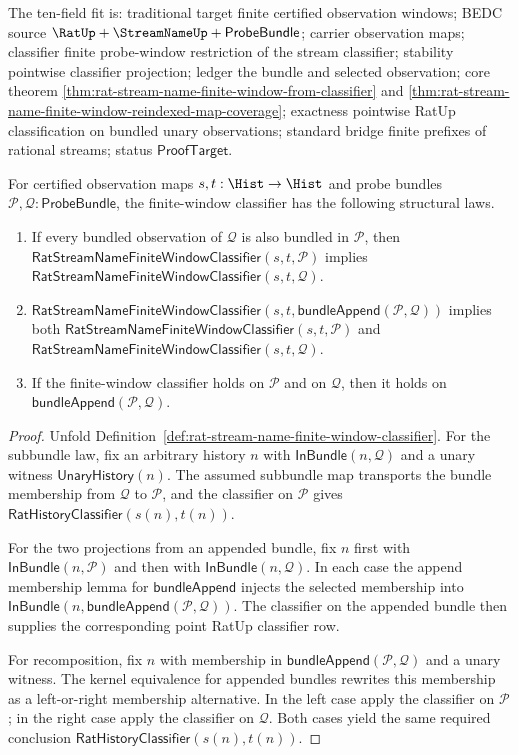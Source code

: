 The ten-field fit is: traditional target finite certified observation windows;
BEDC source $\RatUp+\StreamNameUp+\mathsf{ProbeBundle}$; carrier observation
maps; classifier finite probe-window restriction of the stream classifier;
stability pointwise classifier projection; ledger the bundle and selected
observation; core theorem
\autoref{thm:rat-stream-name-finite-window-from-classifier} and
\autoref{thm:rat-stream-name-finite-window-reindexed-map-coverage}; exactness
pointwise RatUp classification on bundled unary observations; standard bridge
finite prefixes of rational streams; status $\mathsf{ProofTarget}$.

\begin{theorem}
\label{thm:rat-stream-name-finite-window-structural-laws}
For certified observation maps $s,t:\Hist\to\Hist$ and probe bundles
$\mathcal{P},\mathcal{Q}:\mathsf{ProbeBundle}$, the finite-window classifier
has the following structural laws.
\begin{enumerate}
\item If every bundled observation of $\mathcal{Q}$ is also bundled in
$\mathcal{P}$, then
$\mathsf{RatStreamNameFiniteWindowClassifier}(s,t,\mathcal{P})$ implies
$\mathsf{RatStreamNameFiniteWindowClassifier}(s,t,\mathcal{Q})$.
\item
$\mathsf{RatStreamNameFiniteWindowClassifier}
(s,t,\mathsf{bundleAppend}(\mathcal{P},\mathcal{Q}))$ implies both
$\mathsf{RatStreamNameFiniteWindowClassifier}(s,t,\mathcal{P})$ and
$\mathsf{RatStreamNameFiniteWindowClassifier}(s,t,\mathcal{Q})$.
\item If the finite-window classifier holds on $\mathcal{P}$ and on
$\mathcal{Q}$, then it holds on
$\mathsf{bundleAppend}(\mathcal{P},\mathcal{Q})$.
\end{enumerate}
\end{theorem}
\begin{proof}
Unfold Definition~\ref{def:rat-stream-name-finite-window-classifier}. For the
subbundle law, fix an arbitrary history $n$ with
$\mathsf{InBundle}(n,\mathcal{Q})$ and a unary witness
$\mathsf{UnaryHistory}(n)$. The assumed subbundle map transports the bundle
membership from $\mathcal{Q}$ to $\mathcal{P}$, and the classifier on
$\mathcal{P}$ gives $\mathsf{RatHistoryClassifier}(s(n),t(n))$.

For the two projections from an appended bundle, fix $n$ first with
$\mathsf{InBundle}(n,\mathcal{P})$ and then with
$\mathsf{InBundle}(n,\mathcal{Q})$. In each case the append membership lemma
for $\mathsf{bundleAppend}$ injects the selected membership into
$\mathsf{InBundle}(n,\mathsf{bundleAppend}(\mathcal{P},\mathcal{Q}))$. The
classifier on the appended bundle then supplies the corresponding point
RatUp classifier row.

For recomposition, fix $n$ with membership in
$\mathsf{bundleAppend}(\mathcal{P},\mathcal{Q})$ and a unary witness. The
kernel equivalence for appended bundles rewrites this membership as a
left-or-right membership alternative. In the left case apply the classifier on
$\mathcal{P}$; in the right case apply the classifier on $\mathcal{Q}$. Both
cases yield the same required conclusion
$\mathsf{RatHistoryClassifier}(s(n),t(n))$.
\end{proof}
